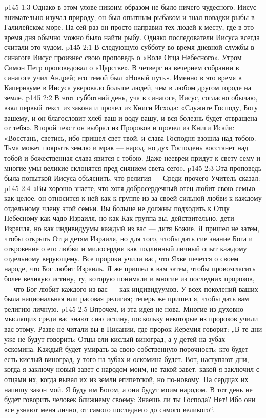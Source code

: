 \vs p145 1:3 Однако в этом улове никоим образом не было ничего чудесного. Иисус внимательно изучал природу; он был опытным рыбаком и знал повадки рыбы в Галилейском море. На сей раз он просто направил тех людей к месту, где в это время дня обычно можно было найти рыбу. Однако последователи Иисуса всегда считали это чудом.
\vs p145 2:1 В следующую субботу во время дневной службы в синагоге Иисус произнес свою проповедь о «Воле Отца Небесного». Утром Симон Петр проповедовал о «Царстве». В четверг на вечернем собрании в синагоге учил Андрей; его темой был «Новый путь». Именно в это время в Капернауме в Иисуса уверовало больше людей, чем в любом другом городе на земле.
\vs p145 2:2 В этот субботний день, уча в синагоге, Иисус, согласно обычаю, взял первый текст из закона и прочел из Книги Исхода: «Служите Господу, Богу вашему, и он благословит хлеб ваш и воду вашу, и вся болезнь будет отвращена от тебя». Второй текст он выбрал из Пророков и прочел из Книги Исайи: «Восстань, светись, ибо пришел свет твой, и слава Господня взошла над тобою. Тьма может покрыть землю и мрак --- народ, но дух Господень восстанет над тобой и божественная слава явится с тобою. Даже неевреи придут к свету сему и многие умы великие склонятся пред сиянием света сего».
\vs p145 2:3 Эта проповедь была попыткой Иисуса объяснить, что религия ---  Среди прочего Учитель сказал:
\vs p145 2:4 «Вы хорошо знаете, что хотя добросердечный отец любит свою семью как целое, он относится к ней как к группе из\hyp{}за своей сильной любви к каждому отдельному члену этой семьи. Вы больше не должны подходить к Отцу Небесному как чадо Израиля, но как  Как группа вы, действительно, дети Израиля, но как индивидуумы каждый из вас --- дитя Божие. Я пришел не затем, чтобы открыть Отца детям Израиля, но для того, чтобы дать сие знание Бога и откровение о его любви и милосердии как подлинный личный опыт каждому отдельному верующему. Все пророки учили вас, что Яхве печется о своем народе, что Бог любит Израиль. Я же пришел к вам затем, чтобы провозгласить более великую истину, ту, которую понимали и многие из последних пророков, --- что Бог любит  каждого из вас --- как индивидуумов. У всех поколений ваших была национальная или расовая религия; теперь же пришел я, чтобы дать вам религию личную.
\vs p145 2:5 Впрочем, и эта идея не нова. Многие из духовно мыслящих среди вас знают сию истину, поскольку некоторые из пророков учили вас этому. Разве не читали вы в Писании, где пророк Иеремия говорит: „В те дни уже не будут говорить: Отцы ели кислый виноград, а у детей на зубах --- оскомина. Каждый будет умирать за свою собственную порочность; кто будет есть кислый виноград, у того на зубах и оскомина будет. Вот, наступают дни, когда я заключу новый завет с народом моим, не такой завет, какой я заключил с отцами их, когда вывел их из земли египетской, но по\hyp{}новому. На сердцах их напишу закон мой. Я буду им Богом, а они будут моим народом. В тот день не будет говорить человек ближнему своему: Знаешь ли ты Господа? Нет! Ибо они все узнают меня лично, от самого последнего до самого великого“.
